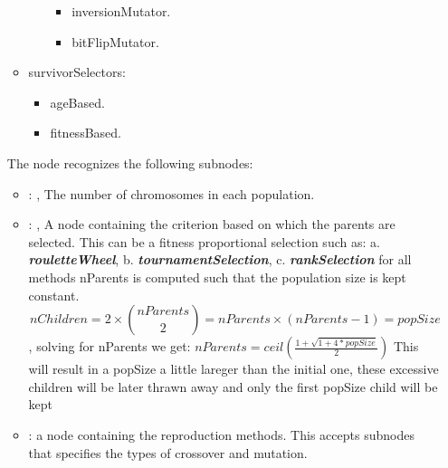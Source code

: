 \begin{itemize}
\begin{itemize}
\begin{itemize}
\begin{itemize}
      \item inversionMutator.
      \item bitFlipMutator.
      \end{itemize}                                                                    \end{itemize}
      \item survivorSelectors:
      \begin{itemize}                                                                        \item
      ageBased.                                                                        \item
      fitnessBased.
      \end{itemize}                                                \end{itemize}

      The  node recognizes the following subnodes:
      \begin{itemize}
        \item {}: , 
          The number of chromosomes in each population.

        \item {}: , 
          A node containing the criterion based on which the parents are selected. This can be a
          fitness proportional selection such as:                   a.
          \textbf{\textit{rouletteWheel}},                   b.
          \textbf{\textit{tournamentSelection}},                   c.
          \textbf{\textit{rankSelection}}                   for all methods nParents is computed
          such that the population size is kept constant.                   \[ nChildren = 2 \times
          {nParents \choose 2} = nParents \times (nParents-1) = popSize \], solving for nParents we
          get:                   $nParents = ceil(\frac{1 + \sqrt{1+4*popSize}}{2})$ This will
          result in a popSize a little lareger than the initial one, these excessive children will
          be later thrawn away and only the first popSize child will be kept

        \item {}:
          a node containing the reproduction methods.                   This accepts subnodes that
          specifies the types of crossover and mutation.


\end{itemize}
\end{itemize}
